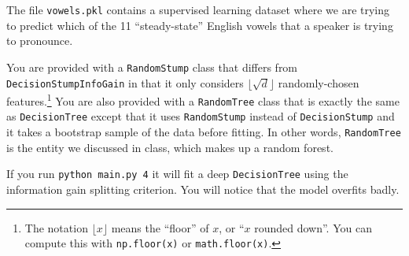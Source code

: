 \documentclass{article}
\begin{document}
    The file \texttt{vowels.pkl} contains a supervised learning dataset where we are trying to predict which of the 11 ``steady-state'' English vowels that a speaker is trying to pronounce.

    You are provided with a \texttt{RandomStump} class that differs from
    \texttt{DecisionStumpInfoGain} in that
    it only considers $\lfloor \sqrt{d} \rfloor$ randomly-chosen features.\footnote{The notation $\lfloor x\rfloor$ means the ``floor'' of $x$, or ``$x$ rounded down''. You can compute this with \texttt{np.floor(x)} or \texttt{math.floor(x)}.}
    You are also provided with a \texttt{RandomTree} class that is exactly the same as
    \texttt{DecisionTree} except that it uses \texttt{RandomStump} instead of
    \texttt{DecisionStump} and it takes a bootstrap sample of the data before fitting.
    In other words, \texttt{RandomTree} is the entity we discussed in class, which
    makes up a random forest.

    If you run \texttt{python main.py 4} it will fit a deep \texttt{DecisionTree}
    using the information gain splitting criterion. You will notice that the model overfits badly.
\end{document}
